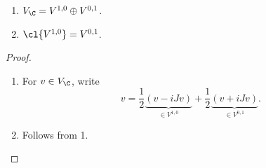 \documentclass[a4paper]{article}
\begin{document}
\begin{lemma}\leavevmode
  \begin{enumerate}
  \item \(V_\C = V^{1, 0} \oplus V^{0, 1}\).
  \item \(\cl{V^{1, 0}} = V^{0, 1}\).
  \end{enumerate}
\end{lemma}

\begin{proof}\leavevmode
  \begin{enumerate}
  \item For \(v \in V_\C\), write
    \[
      v = \frac{1}{2}\underbrace{(v - iJv)}_{\in V^{1, 0}} + \frac{1}{2}\underbrace{(v + i Jv)}_{\in V^{0, 1}}.
    \]
  \item Follows from 1.
  \end{enumerate}
\end{proof}



\printindex
\end{document}
